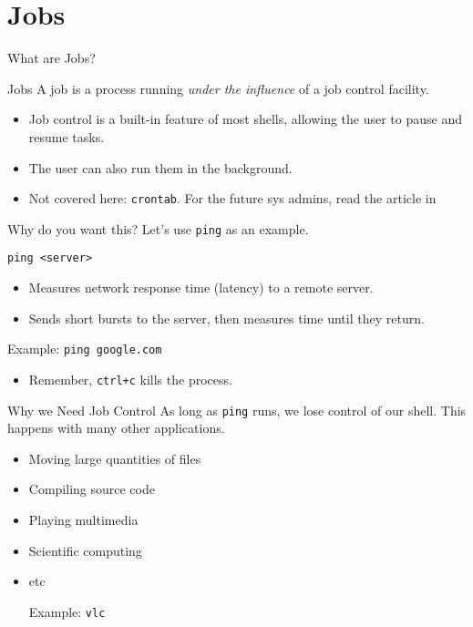 %

%
\section{Jobs}
\label{sec:jobs}

\begin{frame}[fragile]{What are Jobs?}
  \begin{block}{Jobs}
    A job is a process running \emph{under the influence} of a job control facility.
    \begin{itemize}
      \item Job control is a built-in feature of most shells, allowing the user to pause and resume tasks.
      \item The user can also run them in the background.
      \item Not covered here: \texttt{crontab}.  For the future sys admins, read the article in \cite{crontab}
    \end{itemize}
  \end{block}
\end{frame}

\begin{frame}[fragile]{Why do you want this?}
  Let's use \texttt{ping} as an example.
  \begin{block}{}
    \texttt{ping <server>}
    \begin{itemize}
      \item Measures network response time (latency) to a remote server.
      \item Sends short bursts to the server, then measures time until they return.
    \end{itemize}
  \end{block}
  \begin{block}{Example:}
    \texttt{ping google.com}
    \begin{itemize}
      \item Remember, \texttt{ctrl+c} kills the process.
    \end{itemize}
  \end{block}
\end{frame}

\begin{frame}[fragile]{Why we Need Job Control}
  As long as \texttt{ping} runs, we lose control of our shell.  This happens with many other applications.
  \begin{itemize}[<+- | alert@+>]
    \item Moving large quantities of files
    \item Compiling source code
    \item Playing multimedia
    \item Scientific computing
    \item etc
    \begin{block}{Example:}
      \texttt{vlc }
    \end{block}
  \end{itemize}
\end{frame}


